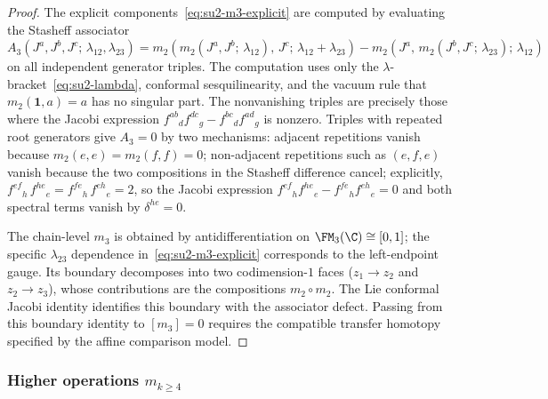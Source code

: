 \begin{proof}
The explicit components~\eqref{eq:su2-m3-explicit} are computed by
evaluating the Stasheff associator
$A_3(J^a, J^b, J^c;\, \lambda_{12}, \lambda_{23})
= m_2(m_2(J^a, J^b;\, \lambda_{12}),\, J^c;\,
\lambda_{12} + \lambda_{23})
- m_2(J^a,\, m_2(J^b, J^c;\, \lambda_{23});\, \lambda_{12})$
on all independent generator triples. The computation uses only
the $\lambda$-bracket~\eqref{eq:su2-lambda}, conformal
sesquilinearity, and the vacuum rule that
$m_2(\mathbf{1}, a)=a$ has no singular part.
The nonvanishing triples are precisely those where the Jacobi
expression $f^{ab}{}_d f^{dc}{}_g - f^{bc}{}_d f^{ad}{}_g$ is
nonzero. Triples with repeated root generators give $A_3 = 0$
by two mechanisms: adjacent repetitions vanish
because $m_2(e,e) = m_2(f,f) = 0$; non-adjacent repetitions
such as $(e,f,e)$ vanish because the two compositions in the
Stasheff difference cancel; explicitly,
$f^{ef}{}_h\, f^{he}{}_e = f^{fe}{}_h\, f^{eh}{}_e = 2$, so
the Jacobi expression
$f^{ef}{}_h f^{he}{}_e - f^{fe}{}_h f^{eh}{}_e = 0$ and both
spectral terms vanish by $\delta^{he} = 0$.

The chain-level $m_3$ is obtained by antidifferentiation on
$\FM_3(\C) \cong [0,1]$; the specific
$\lambda_{23}$ dependence in~\eqref{eq:su2-m3-explicit}
corresponds to the left-endpoint gauge. Its boundary decomposes into
two codimension-$1$ faces ($z_1 \to z_2$ and $z_2 \to z_3$), whose
contributions are the compositions $m_2 \circ m_2$. The Lie conformal
Jacobi identity identifies this boundary with the associator defect.
Passing from this boundary identity to $[m_3]=0$ requires the
compatible transfer homotopy specified by the affine comparison model.
\end{proof}

\subsubsection{Higher operations $m_{k \geq 4}$}

